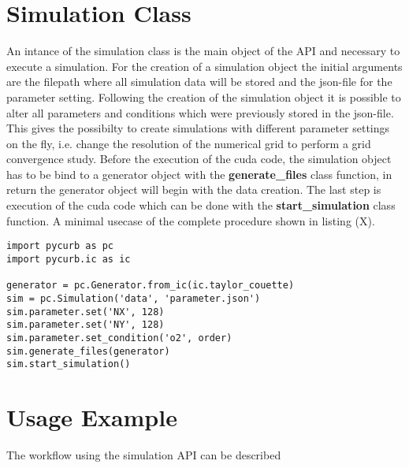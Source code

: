 \section{Simulation Class}

An intance of the simulation class is the main object of the API and
necessary to execute a simulation. For the creation of a simulation object
the initial arguments are the filepath where all simulation data will be stored
and the json-file for the parameter setting.
Following the creation of the simulation object it is possible to alter all parameters and conditions
which were previously stored in the json-file. This gives the possibilty to create
simulations with different parameter settings on the fly, i.e. change the resolution of the numerical grid
to perform a grid convergence study.
Before the execution of the cuda code, the simulation object has to be bind to a generator object
with the \textbf{generate\_files} class function, in return the generator object will begin
with the data creation. The last step is execution of the cuda code which can be done with the \textbf{start\_simulation}
class function.  A minimal usecase of the complete procedure shown in listing (X).


\begin{minipage}{\linewidth}
\begin{lstlisting}[caption='Generator class usage']
import pycurb as pc
import pycurb.ic as ic

generator = pc.Generator.from_ic(ic.taylor_couette)
sim = pc.Simulation('data', 'parameter.json')
sim.parameter.set('NX', 128)
sim.parameter.set('NY', 128)
sim.parameter.set_condition('o2', order)
sim.generate_files(generator)
sim.start_simulation()
\end{lstlisting}
\end{minipage}

\section{Usage Example}

The workflow using the simulation API can be described
